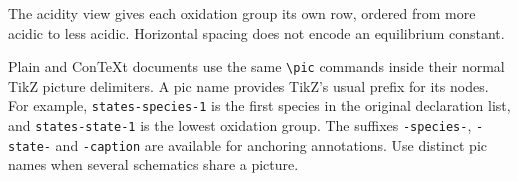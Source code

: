 \documentclass[a4paper,11pt]{ltxdoc}
\begin{document}
\begin{codeexample}[width=0pt]
\end{codeexample}
The acidity view gives each oxidation group its own row, ordered from more acidic
to less acidic. Horizontal spacing does not encode an equilibrium constant.
\begin{codeexample}[width=0pt]
\end{codeexample}
Plain and ConTeXt documents use the same \verb|\pic| commands inside their normal
TikZ picture delimiters. A pic name provides TikZ's usual prefix for its nodes.
For example, \texttt{states-species-1} is the first species in the original
declaration list, and \texttt{states-state-1} is the lowest oxidation group.
The suffixes \texttt{-species-}, \texttt{-state-} and
\texttt{-caption} are available for anchoring annotations. Use distinct pic names
when several schematics share a picture.
\end{document}
